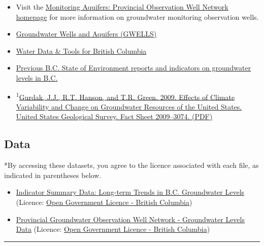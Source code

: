 \documentclass[
]{article}
\begin{document}
\begin{itemize}
\item
  Visit the
  \href{https://www2.gov.bc.ca/gov/content?id=B03D0994BB5C4F98B6F7D4FD8610C836}{Monitoring
  Aquifers: Provincial Observation Well Network homepage} for more
  information on groundwater monitoring observation wells.
\item
  \href{https://apps.nrs.gov.bc.ca/gwells/}{Groundwater Wells and
  Aquifers (GWELLS)}
\item
  \href{https://www2.gov.bc.ca/gov/content?id=A9E4D7847FBC42CEB3A9E8ABAC364BD6}{Water
  Data \& Tools for British Columbia}
\item
  \href{https://www2.gov.bc.ca/gov/content?id=07DD1DCE7F784EFEBA5A26C32CB1646D}{Previous
  B.C. State of Environment reports and indicators on groundwater levels
  in B.C.}
\item
  \textsuperscript{1}\href{https://pubs.usgs.gov/fs/2009/3074/pdf/FS09-3074.pdf}{Gurdak,
  J.J., R.T. Hanson, and T.R. Green. 2009. Effects of Climate
  Variability and Change on Groundwater Resources of the United States.
  United States Geological Survey. Fact Sheet 2009--3074. (PDF)}
\end{itemize}

\hypertarget{data-1}{%
\subsection{Data}\label{data-1}}

*By accessing these datasets, you agree to the licence associated with
each file, as indicated in parentheses below.

\begin{itemize}
\item
  \href{https://catalogue.data.gov.bc.ca/dataset/a74f1b97-17f7-499b-84e7-6455e169e425}{Indicator
  Summary Data: Long-term Trends in B.C. Groundwater Levels} (Licence:
  \href{http://www2.gov.bc.ca/gov/content?id=A519A56BC2BF44E4A008B33FCF527F61}{Open
  Government Licence - British Columbia})
\item
  \href{https://catalogue.data.gov.bc.ca/dataset/57c55f10-cf8e-40bb-aae0-2eff311f16855}{Provincial
  Groundwater Observation Well Network - Groundwater Levels Data}
  (Licence:
  \href{http://www2.gov.bc.ca/gov/content?id=A519A56BC2BF44E4A008B33FCF527F61}{Open
  Government Licence - British Columbia})
\end{itemize}

\begin{center}\rule{0.5\linewidth}{0.5pt}\end{center}
\end{document}
